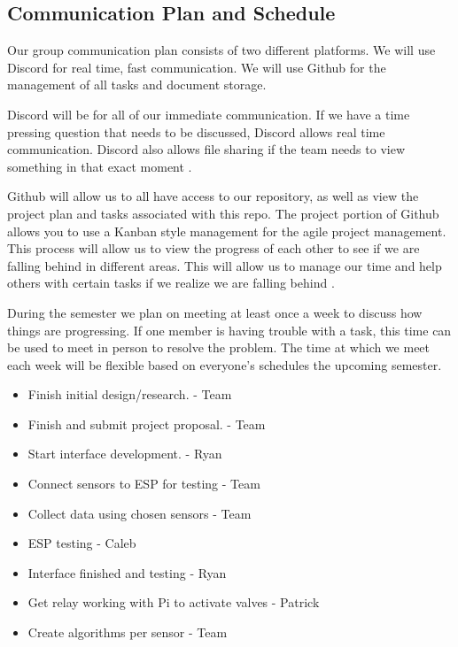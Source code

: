 \documentclass[letterpaper, 10 pt, conference]{ieeeconf}  %
\begin{document}
\subsection{Communication Plan and Schedule}
Our group communication plan consists of two different platforms. We will use Discord for real time, fast communication. We will use Github for the management of all tasks and document storage. 

Discord will be for all of our immediate communication. If we have a time pressing question that needs to be discussed, Discord allows real time communication. Discord also allows file sharing if the team needs to view something in that exact moment \cite{discord}.

Github will allow us to all have access to our repository, as well as view the project plan and tasks associated with this repo. The project portion of Github allows you to use a Kanban style management for the agile project management. This process will allow us to view the progress of each other to see if we are falling behind in different areas. This will allow us to manage our time and help others with certain tasks if we realize we are falling behind \cite{github}. 

During the semester we plan on meeting at least once a week to discuss how things are progressing. If one member is having trouble with a task, this time can be used to meet in person to resolve the problem. The time at which we meet each week will be flexible based on everyone's schedules the upcoming semester.

\begin{itemize}
    \item Finish initial design/research. - Team
    \item Finish and submit project proposal. - Team
    \item Start interface development. - Ryan
\end{itemize}

\begin{itemize}
    \item Connect sensors to ESP for testing - Team
    \item Collect data using chosen sensors - Team
    \item ESP testing - Caleb
\end{itemize}

\begin{itemize}
    \item Interface finished and testing - Ryan
    \item Get relay working with Pi to activate valves - Patrick
    \item Create algorithms per sensor - Team
\end{itemize}
\end{document}
